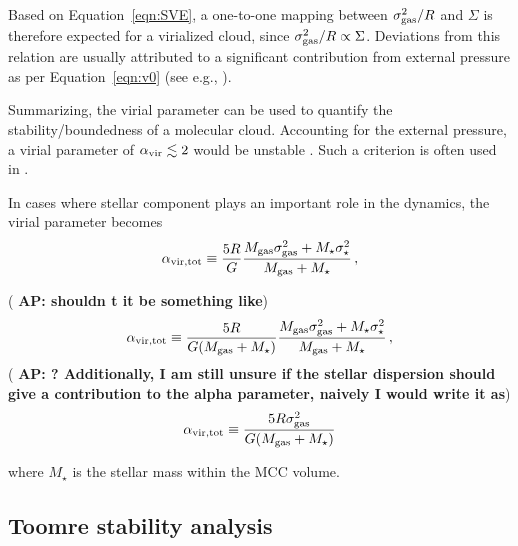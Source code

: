 \IfFileExists{emulateapjlegacy.cls}{\documentclass[iop]{emulateapjlegacy}}{\documentclass[iop]{emulateapj}}
\newcommand{\AP}[1]{({\bf \color{apcolor} AP: #1})}
\begin{document}
Based on Equation~\ref{eqn:SVE}, a one-to-one mapping between $\sigma_{\rm gas}^2/R$ and $\Sigma$ is therefore expected for a virialized cloud, since $\sigma_{\rm gas}^2/R\propto\Sigma$. Deviations from this relation are usually attributed to a significant contribution from external pressure as per Equation~\ref{eqn:v0} (see e.g., \citealt{Heyer09a, Hughes10a, Hughes13b, Meidt13a}).

Summarizing, the virial parameter can be used to quantify the stability/boundedness of 
    a molecular cloud.
Accounting for the external pressure, a virial parameter of $\alpha_{\rm vir}\lesssim2$ would be unstable \citep{bertoldi:1992}.
%
Such a criterion is often used in \obs \citep[see e.g., ][]{Kauffmann17b}. 

In cases where stellar component plays an important role in the dynamics, the virial parameter becomes
\begin{equation}
\alpha_{\rm vir, tot} \equiv \frac{5 R}{G} \frac{M_{\rm gas} \sigma_{\rm gas}^2 + M_{\star} \sigma_\star^2}
					       {M_{\rm gas} + M_{\star} }\,,
\label{eqn:alpha_tot}
\end{equation}

\AP{shouldn t it be something like}
\begin{equation}
\alpha_{\rm vir, tot} \equiv \frac{5 R}{G (M_{\rm gas} + M_{\star})} \frac{M_{\rm gas} \sigma_{\rm gas}^2 + M_{\star} \sigma_\star^2}
					       {M_{\rm gas} + M_{\star} }\,,
\label{eqn:alpha_tot}
\end{equation}
\AP{? Additionally, I am still unsure if the stellar dispersion should give a contribution to the alpha parameter, naively I would write it as}
\begin{equation}
\alpha_{\rm vir, tot} \equiv \frac{5 R \sigma_{\rm gas}^2}{G (M_{\rm gas} + M_{\star})}
\label{eqn:alpha_tot}
\end{equation}

where $M_\star$ is the stellar mass within the MCC volume.


\subsection{Toomre stability analysis}\label{sec:Q}
\end{document}
